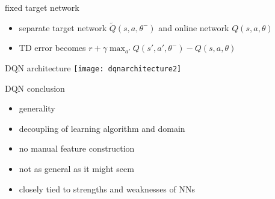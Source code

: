 \begin{frame}{fixed target network}

    
        \begin{itemize}
            \item separate target network  $\tilde{Q}(s, a, \theta^-)$  and online network  $Q(s, a, \theta)$ 
            \item TD error becomes  $r+\gamma\max_{a'} Q(s',a',\theta^-)-Q(s,a,\theta)$
        \end{itemize}
      

\end{frame}


\begin{frame}{DQN architecture}
\texttt{[image: dqnarchitecture2]}
\end{frame}


\begin{frame}{DQN conclusion}

    
        \begin{itemize}
            \item generality
            \item decoupling of learning algorithm and domain
            \item no manual feature construction
            \item not as general as it might seem
            \item closely tied to strengths and weaknesses of NNs
        \end{itemize}
      

\end{frame}